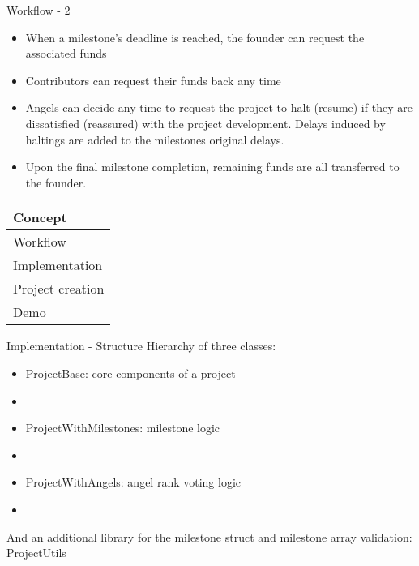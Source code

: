 \documentclass{beamer}
\begin{document}
\begin{frame}{Workflow - 2}
\begin{itemize}
	\item When a milestone's deadline is reached, the founder can request the associated funds
	\item Contributors can request their funds back any time
	\item Angels can decide any time to request the project to halt (resume) if they are dissatisfied (reassured) with the project development. Delays induced by haltings are added to the milestones original delays.
	\item Upon the final milestone completion, remaining funds are all transferred to the founder.
\end{itemize}
\end{frame}


\begin{frame}
	\begin{tabularx}{\textwidth}{X}
		\hline
		Concept\\
		\hline
		Workflow\\
		\hline
		\rowcolor{hcolor}
		Implementation\\
		\hline
		Project creation\\
		\hline
		Demo\\
		\hline
	\end{tabularx}
\end{frame}


\begin{frame}{Implementation - Structure}
Hierarchy of three classes:
\begin{itemize}
	\item ProjectBase: core components of a project
	\item[]
	\item ProjectWithMilestones: milestone logic
	\item[]
	\item ProjectWithAngels: angel rank voting logic
	\item[]
\end{itemize}
And an additional library for the milestone struct and milestone array validation: ProjectUtils
\end{frame}
\end{document}
